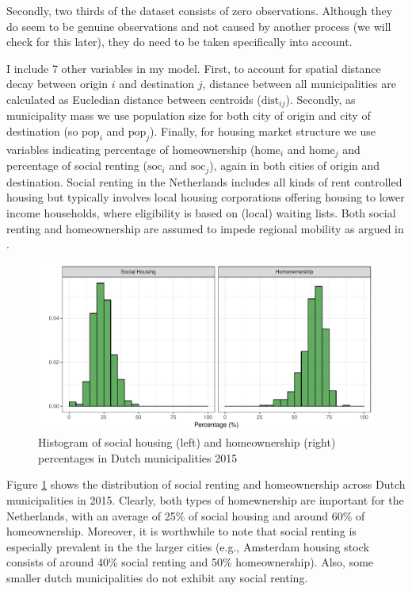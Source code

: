 \documentclass[fleqn,10pt]{SelfArx} %
\begin{document}
        Secondly, two thirds of the dataset consists of zero
        observations. Although they do seem to be genuine observations
        and not caused by another process (we will check for this
        later), they do need to be taken specifically into account. 

        I include 7 other variables in my model. First, to account for
        spatial distance decay between origin $i$ and destination $j$,
        distance between all municipalities are calculated as
        Eucledian distance between centroids
        ($\text{dist}_{ij}$). Secondly, as municipality mass we use
        population size for both city of origin and city of destination (so $\text{pop}_i$ and
        $\text{pop}_j$). Finally, for housing market structure we use
        variables indicating percentage of homeownership
        ($\text{home}_i$ and $\text{home}_j$ and percentage of social
        renting ($\text{soc}_i$ and $\text{soc}_j$), again in both cities of origin and destination. Social renting in the Netherlands includes all kinds of rent controlled housing but typically
        involves local housing corporations offering housing to lower
        income households, where eligibility is based on (local) waiting
        lists. Both social renting and homeownership are assumed to
        impede regional mobility as argued in \citep{de2009homeownership}.

        \begin{figure}[ht]\centering %
          \includegraphics[width=0.8\linewidth]{../fig/hist_housing.pdf}
          \caption{Histogram of social housing (left) and
            homeownership (right) percentages in Dutch municipalities
            2015}
            \label{fig:housing_mig}
        \end{figure}

        Figure \ref{fig:housing_mig} shows the distribution of social
        renting and homeownership across Dutch municipalities in 2015.
        Clearly, both types of homewnership are important for the
        Netherlands, with an average of 25\% of social housing and
        around 60\% of homeownership. Moreover, it is worthwhile to
        note that social renting is especially prevalent in the the
        larger cities (e.g., Amsterdam housing stock consists of around 40\% social renting
        and 50\% homeownership). Also, some smaller dutch municipalities do not exhibit
        any social renting.
        
\end{document}
